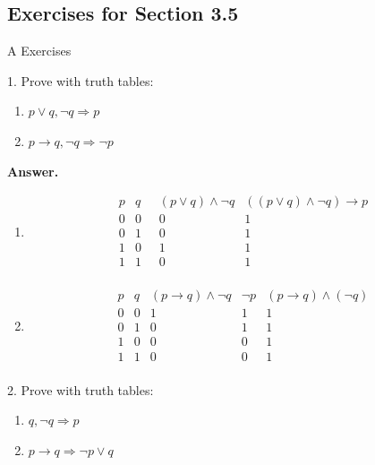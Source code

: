 \documentclass[10pt,]{book}
\theoremstyle{plain}
\theoremstyle{definition}
\theoremstyle{definition}
\theoremstyle{definition}
\theoremstyle{definition}
\begin{document}
\subsection[Exercises for Section 3.5 ]{Exercises for Section 3.5 }\label{exercises-3.5}
\hypertarget{exercisegroup-6}{}\typeout{************************************************}
\typeout{************************************************}
A Exercises%
\begin{exercisegroup}
\item[1.]\hypertarget{exercise-24}{} Prove with truth tables:%
\par
\leavevmode%
\begin{enumerate}[label=\alph*]
\item\hypertarget{li-113}{} \(p\lor  q, \neg q\Rightarrow  p\)%
\item\hypertarget{li-114}{} \(p \rightarrow  q, \neg q \Rightarrow  \neg p\)%
\end{enumerate}

%
\par\smallskip
\par\smallskip
\noindent\textbf{Answer.}\hypertarget{answer-11}{}\quad
\leavevmode%
\begin{enumerate}[label=\alph*]
\item\hypertarget{li-115}{}  
\[
 \begin{array}{cccc}
 p & q\text{   } &  (p\lor q)\land \neg q & ((p\lor q)\land \neg q)\to p \\
 0 & 0 & 0 & 1 \\
 0 & 1 & 0 & 1 \\
 1 & 0 & 1 & 1 \\
 1 & 1 & 0 & 1 \\
\end{array}
\] %
\item\hypertarget{li-116}{} \[\begin{array}{cccc}
 p & q  & (p\to q)\land \neg q & \neg p & (p\to q)\land (\neg q) \\
 0 & 0 & 1 & 1 & 1 \\
 0 & 1 & 0 & 1 & 1 \\
 1 & 0 & 0 & 0 & 1 \\
 1 & 1 & 0 & 0 & 1 \\
\end{array}\]%
\end{enumerate}
%
\item[2.]\hypertarget{exercise-25}{} Prove with truth tables:%
\par
\leavevmode%
\begin{enumerate}[label=\alph*]
\item\hypertarget{li-117}{} \(q, \neg q\Rightarrow  p\)%
\item\hypertarget{li-118}{}  \(p \rightarrow  q \Rightarrow  \neg p \lor  q\)%
\end{enumerate}

%
\par\smallskip
\end{exercisegroup}
\end{document}
